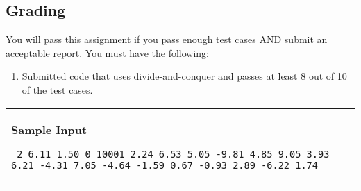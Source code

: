 \documentclass[11pt]{article}
\begin{document}
\subsection*{Grading}

You will pass this assignment if you pass enough test cases AND submit an acceptable report. You must have the following:

\begin{enumerate}

\item Submitted code that uses divide-and-conquer and passes at least 8 out of 10 of the test cases.


\end{enumerate} 


\vspace{0.25in}\hspace{-0.3in}\begin{tabular}{ll}

\parbox{3in}{{\large\bf Sample Input}

\vspace{0.15in}

{\tt 
2 6.11 1.50 0 10001 2.24 6.53 5.05 -9.81 4.85 9.05 3.93 6.21 -4.31 7.05 -4.64 -1.59 0.67 -0.93 2.89 -6.22 1.74
}
}


\end{tabular}
\end{document}
